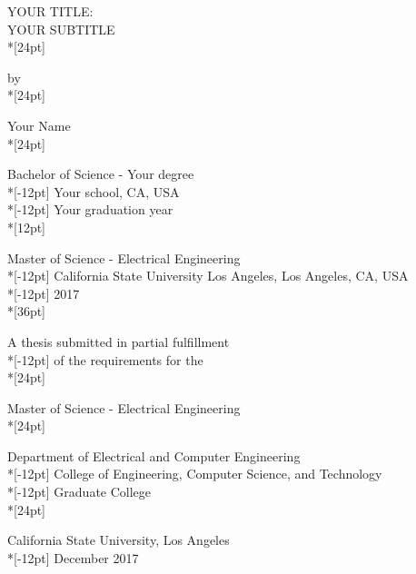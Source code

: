 \thispagestyle{empty}%
 \begin{center}
 YOUR TITLE:\\ YOUR SUBTITLE\\*[24pt]%

\normalsize by\\*[24pt]

Your Name\\*[24pt]

 Bachelor of Science - Your degree\\*[-12pt]%
 Your school, CA, USA\\*[-12pt]
 Your graduation year\\*[12pt]
 
 Master of Science - Electrical Engineering\\*[-12pt]%
  California State University Los Angeles, Los Angeles, CA, USA\\*[-12pt]
 2017\\*[36pt]

 A thesis submitted in partial fulfillment\\*[-12pt]
 of the requirements for the\\*[24pt]

 {Master of Science - Electrical Engineering} \\*[24pt]
 
 {Department of Electrical and Computer Engineering}\\*[-12pt]
 {College of Engineering, Computer Science, and Technology}\\*[-12pt]
 {Graduate College}\\*[24pt]
 
 {California State University, Los Angeles}\\*[-12pt]
 {December 2017}
\end{center}
